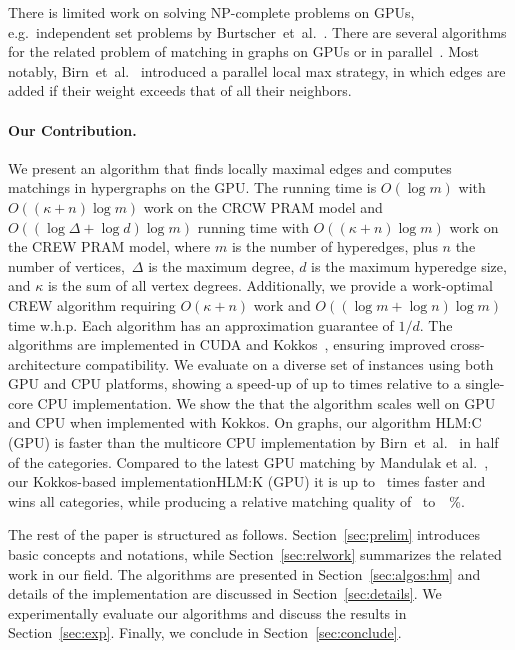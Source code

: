 \documentclass[runningheads]{llncs}
\newcommand{\algoFont}[1]{{\textsc{#1}}\xspace}
\newcommand{\competitorOUR}{\algoFont{HLM:C (GPU)}}
\newcommand{\competitorOURKokkosGPU}{\algoFont{HLM:K (GPU)}}
\begin{document}
There is limited work on solving NP-complete problems on GPUs, e.g.~independent set problems by Burtscher~et~al.~\cite{burtscher2018high}.
There are several algorithms for the related problem of matching in graphs on GPUs or in parallel~\cite{auer2012gpu,manne2014new,birn2013efficient}.
Most notably, Birn~et~al.~\cite{birn2013efficient} introduced a parallel local max strategy, in which edges are added if their weight exceeds that of all their neighbors.
\paragraph*{Our Contribution.}
We present an algorithm that finds locally maximal edges and computes matchings in hypergraphs on the GPU.
The  running time is $O(\log{m})$ with $O((\kappa + n) \log{m})$ work on the CRCW PRAM model and $O((\log{\Delta} + \log{d}) \log{m})$ running time with $O((\kappa + n) \log{m})$ work on the CREW PRAM model, where $m$ is the number of hyperedges, plus $n$ the number of vertices,~$\Delta$ is the maximum degree, $d$ is the maximum hyperedge size, and $\kappa$ is the sum of all vertex degrees.
Additionally, we provide a work-optimal CREW algorithm requiring $O(\kappa + n)$ work and $O((\log{m}+\log{n})\log{m})$ time  w.h.p.
Each algorithm has an approximation guarantee of $1/d$.  The algorithms are implemented in CUDA and Kokkos~\cite{KokkosEcosystem2021}, ensuring improved cross-architecture compatibility. We evaluate on a diverse set of instances using both GPU and CPU platforms, showing  a speed-up of up to  times relative to a single-core CPU implementation.
We show the that the algorithm scales well on GPU and CPU when implemented with Kokkos.
On graphs, our algorithm \competitorOUR is faster than the  multicore CPU implementation by Birn~et~al.~\cite{birn2013efficient} in half of the categories. 
Compared to the latest GPU matching by Mandulak et al.~\cite{mandulak2024efficient}, our Kokkos-based implementation\competitorOURKokkosGPU it is up to~ times faster and wins all categories, while producing a relative matching quality of~ to~~\%.

The rest of the paper is structured as follows. Section~\ref{sec:prelim} introduces basic concepts and notations, while Section~\ref{sec:relwork} summarizes the related work in our field.
The algorithms are presented in Section~\ref{sec:algos:hm} and details of the implementation are discussed in Section~\ref{sec:details}. We experimentally evaluate our algorithms and discuss the results in Section~\ref{sec:exp}. Finally, we conclude in Section~\ref{sec:conclude}.
\end{document}
